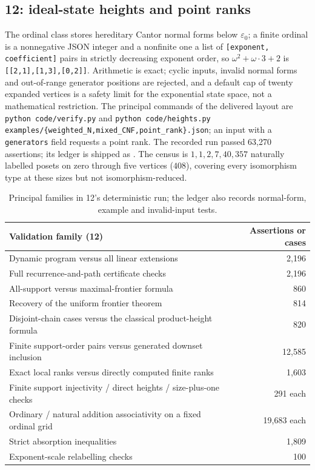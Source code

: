 \documentclass[11pt,a4paper]{article}
\theoremstyle{definition}
\theoremstyle{remark}
\newcommand{\eps}{\varepsilon_0}
\begin{document}
\subsection{12: ideal-state heights and point ranks}

The ordinal class stores hereditary Cantor normal forms below $\eps$; a finite
ordinal is a nonnegative JSON integer and a nonfinite one a list of
\texttt{[exponent, coefficient]} pairs in strictly decreasing exponent order,
so $\omega^2+\omega\cdot3+2$ is \texttt{[[2,1],[1,3],[0,2]]}. Arithmetic is
exact; cyclic inputs, invalid normal forms and out-of-range generator positions
are rejected, and a default cap of twenty expanded vertices is a safety limit
for the exponential state space, not a mathematical restriction. The principal
commands of the delivered layout are \texttt{python code/verify.py} and
\texttt{python code/heights.py examples/\{weighted\_N,mixed\_CNF,point\_rank\}.json};
an input with a \texttt{generators} field requests a point rank. The recorded
run passed 63{,}270 assertions; its ledger is shipped as
. The census is $1,1,2,7,40,357$
naturally labelled posets on zero through five vertices ($408$), covering every
isomorphism type at these sizes but not isomorphism-reduced.

\begin{table}[htbp]
\centering\small
\begin{tabularx}{\linewidth}{@{}Xr@{}}
\toprule
Validation family (12) & Assertions or cases\\
\midrule
Dynamic program versus all linear extensions & 2,196\\
Full recurrence-and-path certificate checks & 2,196\\
All-support versus maximal-frontier formula & 860\\
Recovery of the uniform frontier theorem & 814\\
Disjoint-chain cases versus the classical product-height formula & 820\\
Finite support-order pairs versus generated downset inclusion & 12,585\\
Exact local ranks versus directly computed finite ranks & 1,603\\
Finite support injectivity / direct heights / size-plus-one checks & 291 each\\
Ordinary / natural addition associativity on a fixed ordinal grid & 19,683 each\\
Strict absorption inequalities & 1,809\\
Exponent-scale relabelling checks & 100\\
\bottomrule
\end{tabularx}
\caption{Principal families in 12's deterministic run; the ledger also records
normal-form, example and invalid-input tests.}
\label{nh:tab:ranksverify}
\end{table}
\end{document}
